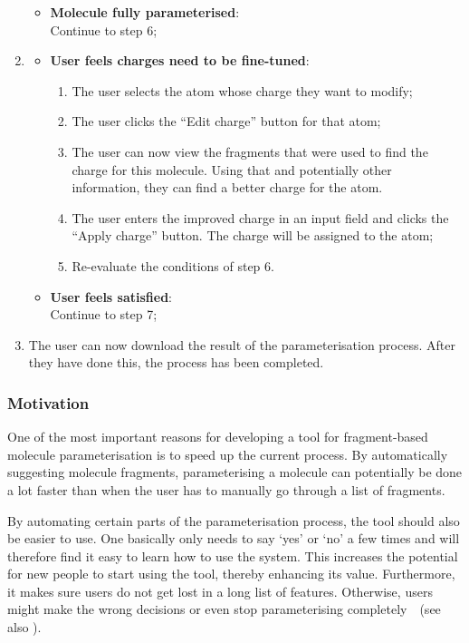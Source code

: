 \begin{enumerate}[itemsep=.1em, parsep=.2em, topsep=0em]
\begin{itemize}[leftmargin=0cm, itemsep=.1em, parsep=.1em]
  \item[] {\bf Molecule fully parameterised}:\\Continue to step 6;
  \end{itemize}
\item
  \begin{itemize}[leftmargin=0cm, itemsep=.1em, parsep=.1em]
  \item[] {\bf User feels charges need to be fine-tuned}:
    \begin{enumerate}
    \item The user selects the atom whose charge they want to modify;
    \item The user clicks the ``Edit charge'' button for that atom;
    \item The user can now view the fragments that were used to find the charge for this molecule. Using that and potentially other information, they can find a better charge for the atom.
    \item The user enters the improved charge in an input field and clicks the ``Apply charge'' button. The charge will be assigned to the atom;
    \item Re-evaluate the conditions of step 6.
    \end{enumerate}
  \item[]{\bf User feels satisfied}:\\Continue to step 7;
  \end{itemize}
\item The user can now download the result of the parameterisation process. After they have done this, the process has been completed.
\end{enumerate}

\subsubsection{Motivation}
One of the most important reasons for developing a tool for fragment-based molecule parameterisation is to speed up the current process. By automatically suggesting molecule fragments, parameterising a molecule can potentially be done a lot faster than when the user has to manually go through a list of fragments.

By automating certain parts of the parameterisation process, the tool should also be easier to use. One basically only needs to say `yes' or `no' a few times and will therefore find it easy to learn how to use the system. This increases the potential for new people to start using the tool, thereby enhancing its value. Furthermore, it makes sure users do not get lost in a long list of features. Otherwise, users might make the wrong decisions or even stop parameterising completely~\cite{norman2002design}~(see also ).

